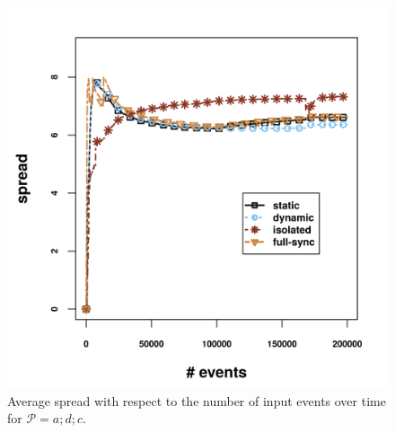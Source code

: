 \begin{figure}[H]
	\centering
	\includegraphics[width=\textwidth,height=.9\textwidth,keepaspectratio]{chapters/figures/synthetic/new/spread_synthetic.png}
	
	\caption{Average spread  with respect to the number of input events over time for $\mathcal{P}=a;d;c$.}
	\label{fig:spread_synthetic}
\end{figure}

